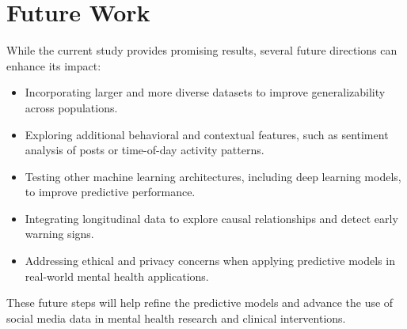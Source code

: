 \documentclass[twocolumn,numbers]{article}
\begin{document}
\section{Future Work}
While the current study provides promising results, several future directions can enhance its impact:
\begin{itemize}
    \item Incorporating larger and more diverse datasets to improve generalizability across populations.
    \item Exploring additional behavioral and contextual features, such as sentiment analysis of posts or time-of-day activity patterns.
    \item Testing other machine learning architectures, including deep learning models, to improve predictive performance.
    \item Integrating longitudinal data to explore causal relationships and detect early warning signs.
    \item Addressing ethical and privacy concerns when applying predictive models in real-world mental health applications.
\end{itemize}
These future steps will help refine the predictive models and advance the use of social media data in mental health research and clinical interventions.



\end{document}
